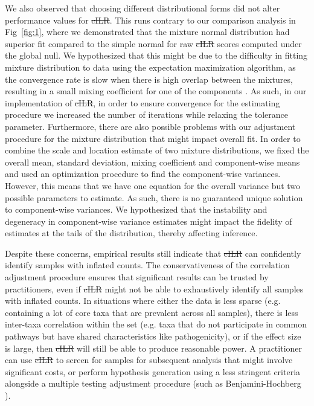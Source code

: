 \documentclass[10pt,letterpaper]{article}
\providecommand{\DIFaddtex}[1]{{\protect\color{blue}\uwave{#1}}} %
\providecommand{\DIFdeltex}[1]{{\protect\color{red}\sout{#1}}}                      %
\providecommand{\DIFaddbegin}{} %
\providecommand{\DIFaddend}{} %
\providecommand{\DIFdelbegin}{} %
\providecommand{\DIFdelend}{} %
\providecommand{\DIFadd}[1]{\texorpdfstring{\DIFaddtex{#1}}{#1}} %
\providecommand{\DIFdel}[1]{\texorpdfstring{\DIFdeltex{#1}}{}} %
\newcommand{\DIFscaledelfig}{0.5}
\newlength{\DIFdelgraphicswidth} %
\newlength{\DIFdelgraphicsheight} %
\newcommand{\DIFaddincludegraphics}[2][]{{\color{blue}\fbox{\DIFOincludegraphics[#1]{#2}}}} %
\newcommand{\DIFdelincludegraphics}[2][]{%
\sbox{\DIFdelgraphicsbox}{\DIFOincludegraphics[#1]{#2}}%
\settoboxwidth{\DIFdelgraphicswidth}{\DIFdelgraphicsbox} %
\settoboxtotalheight{\DIFdelgraphicsheight}{\DIFdelgraphicsbox} %
\scalebox{\DIFscaledelfig}{%
\parbox[b]{\DIFdelgraphicswidth}{\usebox{\DIFdelgraphicsbox}\\[-\baselineskip] \rule{\DIFdelgraphicswidth}{0em}}\llap{\resizebox{\DIFdelgraphicswidth}{\DIFdelgraphicsheight}{%
\setlength{\unitlength}{\DIFdelgraphicswidth}%
\begin{picture}(1,1)%
\thicklines\linethickness{2pt} %
{\color[rgb]{1,0,0}\put(0,0){\framebox(1,1){}}}%
{\color[rgb]{1,0,0}\put(0,0){\line( 1,1){1}}}%
{\color[rgb]{1,0,0}\put(0,1){\line(1,-1){1}}}%
\end{picture}%
}\hspace*{3pt}}} %
} %
\DeclareRobustCommand{\DIFaddbegin}{\DIFOaddbegin \let\includegraphics\DIFaddincludegraphics} %
\DeclareRobustCommand{\DIFaddend}{\DIFOaddend \let\includegraphics\DIFOincludegraphics} %
\DeclareRobustCommand{\DIFdelbegin}{\DIFOdelbegin \let\includegraphics\DIFdelincludegraphics} %
\DeclareRobustCommand{\DIFdelend}{\DIFOaddend \let\includegraphics\DIFOincludegraphics} %
\begin{document}
We also observed that choosing different distributional forms did not alter performance values for \DIFdelbegin \DIFdel{cILR}\DIFdelend \DIFaddbegin \DIFadd{CBEA}\DIFaddend . This runs contrary to our comparison analysis in Fig~\ref{fig:1}, where we demonstrated that the mixture normal distribution had superior fit compared to the simple normal for raw \DIFdelbegin \DIFdel{cILR }\DIFdelend \DIFaddbegin \DIFadd{CBEA }\DIFaddend scores computed under the global null. We hypothesized that this might be due to the difficulty in fitting mixture distribution to data using the expectation maximization algorithm, as the convergence rate is slow when there is high overlap between the mixtures, resulting in a small mixing coefficient for one of the components \cite{naim2012}. As such, in our implementation of \DIFdelbegin \DIFdel{cILR}\DIFdelend \DIFaddbegin \DIFadd{CBEA}\DIFaddend , in order to ensure convergence for the estimating procedure we increased the number of iterations while relaxing the tolerance parameter. Furthermore, there are also possible problems with our adjustment procedure for the mixture distribution that might impact overall fit. In order to combine the scale and location estimate of two mixture distributions, we fixed the overall mean, standard deviation, mixing coefficient and component-wise means and used an optimization procedure to find the component-wise variances. However, this means that we have one equation for the overall variance but two possible parameters to estimate. As such, there is no guaranteed unique solution to component-wise variances. We hypothesized that the instability and degeneracy in component-wise variance estimates might impact the fidelity of estimates at the tails of the distribution, thereby affecting inference.  

Despite these concerns, empirical results still indicate that \DIFdelbegin \DIFdel{cILR }\DIFdelend \DIFaddbegin \DIFadd{CBEA }\DIFaddend can confidently identify samples with inflated counts. The conservativeness of the correlation adjustment procedure ensures that significant results can be trusted by practitioners, even if \DIFdelbegin \DIFdel{cILR }\DIFdelend \DIFaddbegin \DIFadd{CBEA }\DIFaddend might not be able to exhaustively identify all samples with inflated counts. In situations where either the data is less sparse (e.g. containing a lot of core taxa that are prevalent across all samples), there is less inter-taxa correlation within the set (e.g. taxa that do not participate in common pathways but have shared characteristics like pathogenicity), or if the effect size is large, then \DIFdelbegin \DIFdel{cILR }\DIFdelend \DIFaddbegin \DIFadd{CBEA }\DIFaddend will still be able to produce reasonable power. A practitioner can use \DIFdelbegin \DIFdel{cILR }\DIFdelend \DIFaddbegin \DIFadd{CBEA }\DIFaddend to screen for samples for subsequent analysis that might involve significant costs, or perform hypothesis generation using a less stringent criteria alongside a multiple testing adjustment procedure (such as Benjamini-Hochberg \cite{benjamini1995}). 
\end{document}
